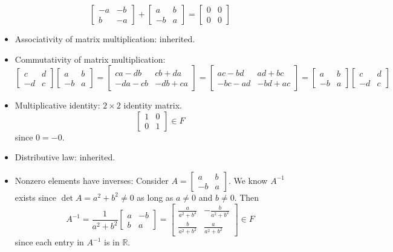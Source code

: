 \documentclass{amsart}
\begin{document}
\begin{itemize}
		$$ \begin{bmatrix}
		-a & -b \\
		b & -a
		\end{bmatrix} +
		\begin{bmatrix}
		a & b \\
		-b & a
		\end{bmatrix} = \begin{bmatrix}
		0 & 0 \\
		0 & 0
		\end{bmatrix} $$
		\item Associativity of matrix multiplication: inherited.
		\item Commutativity of matrix multiplication:
		$$ \begin{bmatrix}
		c & d \\
		-d & c
		\end{bmatrix} 
		\begin{bmatrix}
		a & b \\
		-b & a
		\end{bmatrix} = \begin{bmatrix}
		ca-db & cb+da \\
		-da-cb & -db+ca
		\end{bmatrix} = \begin{bmatrix}
		ac-bd & ad+bc \\
		-bc-ad & -bd+ac
		\end{bmatrix} = 
		\begin{bmatrix}
		a & b \\
		-b & a
		\end{bmatrix} \begin{bmatrix}
		c & d \\
		-d & c
		\end{bmatrix}  $$
		\item Multiplicative identity: $2\times 2$ identity matrix.
		$$ \begin{bmatrix}
		1 & 0 \\
		0 & 1
		\end{bmatrix} \in F $$ since $0 = -0$.
		\item Distributive law: inherited.
		\item Nonzero elements have inverses:
		Consider $A = \begin{bmatrix}
		a & b \\
		-b & a
		\end{bmatrix}$. We know $A^{-1}$ exists since $\det A = a^2 + b^2 \neq 0$ as long as $a \neq 0$ and $b \neq 0$. Then $$A^{-1} = \frac{1}{a^2 + b^2}\begin{bmatrix}
		a & -b \\
		b & a
		\end{bmatrix} = \begin{bmatrix}
		\frac{a}{a^2 + b^2} & -\frac{b}{a^2 + b^2} \\
		\frac{b}{a^2 + b^2} & \frac{a}{a^2 + b^2} 
		\end{bmatrix} \in F $$ since each entry in $A^{-1}$ is in $\mathbb{R}$.
	\end{itemize}
\end{document}
